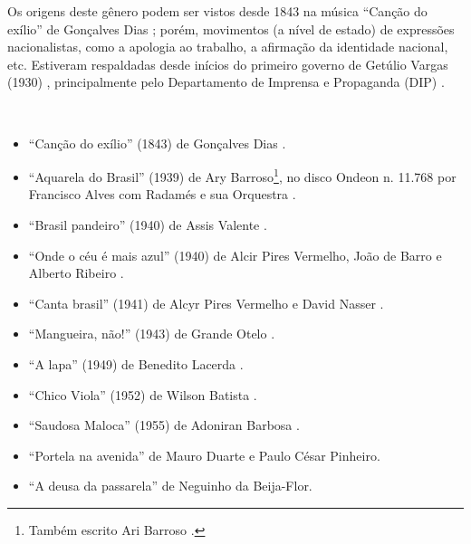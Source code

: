 Os origens deste gênero podem ser vistos desde 1843 na música ``Canção do exílio'' de Gonçalves Dias \cite[pp. 128]{perna2002samba};
porém, movimentos (a nível de estado) de expressões nacionalistas, como a apologia ao trabalho,
a afirmação da identidade nacional, etc.
Estiveram respaldadas desde inícios do primeiro governo de Getúlio Vargas (1930) \cite[pp. 67]{haussen2001radio},
principalmente pelo Departamento de Imprensa e Propaganda (DIP) \cite[pp. 74]{fenerick2005nem}.
\begin{example} ~

\begin{itemize}
\item ``Canção do exílio'' (1843) de Gonçalves Dias \cite[pp. 128]{perna2002samba}.
\item ``Aquarela do Brasil'' (1939) de Ary Barroso\footnote{Também escrito Ari Barroso  \cite[pp. 685]{marcondes1977enciclopediav2}.},
no disco Ondeon n. 11.768 por Francisco Alves com Radamés e sua Orquestra  \cite[pp. 685]{marcondes1977enciclopediav2} \cite[pp. 73]{diniz2006almanaque} \cite[pp. 128]{perna2002samba}.

\item ``Brasil pandeiro'' (1940) de Assis Valente \cite{subgenerosdosamba2} \cite[pp. 920]{marcondes1977enciclopediav2}.
\item ``Onde o céu é mais azul'' (1940) de Alcir Pires Vermelho, João de Barro e Alberto Ribeiro \cite[pp. 67]{haussen2001radio} \cite[pp. 1060]{marcondes1977enciclopediav2}.
\item ``Canta brasil'' (1941) de Alcyr Pires Vermelho e David Nasser \cite[pp. 53]{chediak2004101} \cite[pp. 929]{marcondes1977enciclopediav2}.
\item ``Mangueira, não!'' (1943) de Grande Otelo \cite{subgenerosdosamba2}.
\item ``A lapa'' (1949) de Benedito Lacerda \cite{subgenerosdosamba2}.
\item ``Chico Viola'' (1952) de Wilson Batista \cite{subgenerosdosamba2}.
\item ``Saudosa Maloca'' (1955) de Adoniran Barbosa \cite{subgenerosdosamba2}.

\item ``Portela na avenida''  de Mauro Duarte e Paulo César Pinheiro.
\item ``A deusa da passarela'' de Neguinho da Beija-Flor.

\end{itemize}
\end{example}

